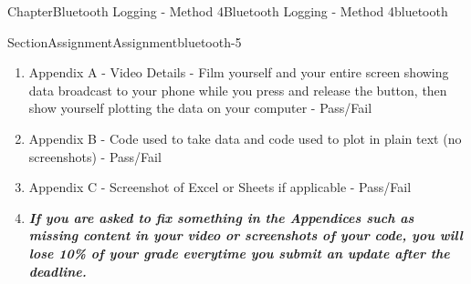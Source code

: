 \documentclass[oneside,10pt,]{book}
\newcommand{\alert}[1]{\textbf{\textit{#1}}}
\numberwithin{equation}{section}
\begin{document}
\begin{chapterptx}{Chapter}{Bluetooth Logging - Method 4}{}{Bluetooth Logging - Method 4}{}{}{bluetooth}
\begin{sectionptx}{Section}{Assignment}{}{Assignment}{}{}{bluetooth-5}
\begin{introduction}{}
\begin{enumerate}
\item{}Appendix A - Video Details - Film yourself and your entire screen showing data broadcast to your phone while you press and release the button, then show yourself plotting the data on your computer - Pass\slash{}Fail%
\item{}Appendix B - Code used to take data and code used to plot in plain text (no screenshots) - Pass\slash{}Fail%
\item{}Appendix C - Screenshot of Excel or Sheets if applicable - Pass\slash{}Fail%
\item{}\alert{If you are asked to fix something in the Appendices such as missing content in your video or screenshots of your code, you will lose 10\% of your grade everytime you submit an update after the deadline.}%
\end{enumerate}
\end{introduction}%
\end{sectionptx}
\end{chapterptx}
%
%
\typeout{************************************************}
\typeout{************************************************}
%
\end{document}
